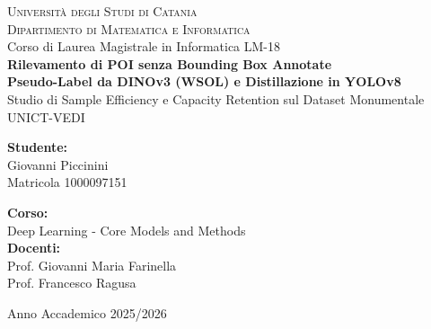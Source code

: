 \documentclass[11pt,a4paper,titlepage,openany]{report}
\begin{document}
\begin{titlepage}
    \centering
    \vspace*{0.5cm}
    
    {\Large\textsc{Università degli Studi di Catania}}\\[0.3cm]
    {\large\textsc{Dipartimento di Matematica e Informatica}}\\[0.2cm]
    {\normalsize Corso di Laurea Magistrale in Informatica LM-18}\\[2.5cm]
    
    {\huge\bfseries\color{primaryblue} Rilevamento di POI senza Bounding Box Annotate}\\[0.5cm]
    {\LARGE\bfseries\color{accentblue} Pseudo-Label da DINOv3 (WSOL) e Distillazione in YOLOv8}\\[0.6cm]
    {\large Studio di Sample Efficiency e Capacity Retention sul Dataset Monumentale UNICT-VEDI}\\[3.0cm]
    
    \begin{minipage}[t]{0.45\textwidth}
        \flushleft
        \textbf{\color{darkcharcoal}Studente:}\\[0.15cm]
        Giovanni Piccinini\\[0.1cm]
        Matricola 1000097151
    \end{minipage}
    \hfill
    \begin{minipage}[t]{0.50\textwidth}
        \flushright
        \textbf{\color{darkcharcoal}Corso:}\\[0.15cm]
        Deep Learning - Core Models and Methods\\[0.3cm]
        \textbf{\color{darkcharcoal}Docenti:}\\[0.15cm]
        Prof. Giovanni Maria Farinella\\[0.1cm]
        Prof. Francesco Ragusa
    \end{minipage}
    
    \vfill
    {\small\color{darkcharcoal} Anno Accademico 2025/2026}
\end{titlepage}

\end{document}
